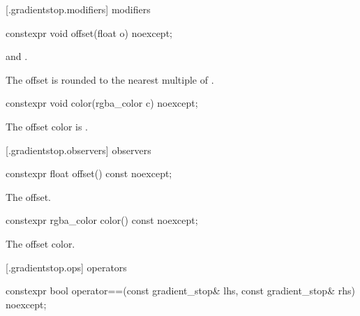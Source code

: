  [\iotwod.gradientstop.modifiers] { modifiers}

%
\begin{itemdecl}
constexpr void offset(float o) noexcept;
\end{itemdecl}
\begin{itemdescr}
\pnum
\requires
{} and .

\pnum
\effects
The offset is  rounded to the nearest multiple of .
\end{itemdescr}

%
\begin{itemdecl}
constexpr void color(rgba_color c) noexcept;
\end{itemdecl}
\begin{itemdescr}
\pnum
\effects
The offset color is .
\end{itemdescr}

 [\iotwod.gradientstop.observers] { observers}

%
\begin{itemdecl}
constexpr float offset() const noexcept;
\end{itemdecl}
\begin{itemdescr}
\pnum
\returns
The offset.
\end{itemdescr}

%
\begin{itemdecl}
constexpr rgba_color color() const noexcept;
\end{itemdecl}
\begin{itemdescr}
\pnum
\returns
The offset color.
\end{itemdescr}

 [\iotwod.gradientstop.ops] { operators}

%
\begin{itemdecl}
constexpr bool operator==(const gradient_stop& lhs, const gradient_stop& rhs)
  noexcept;
\end{itemdecl}
\begin{itemdescr}
\pnum
\returns
{}
\end{itemdescr}
